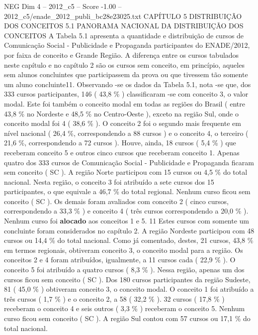\begin{textsample}{NEG Dim 4 – 2012\_c5 – Score -1.00 – 2012\_c5/enade\_2012\_publi\_bc28e23025.txt}  \label{ex:f4_neg_107}
CAPÍTULO 5 DISTRIBUIÇÃO DOS CONCEITOS 5.1 PANORAMA NACIONAL DA DISTRIBUIÇÃO DOS CONCEITOS A Tabela 5.1 apresenta a quantidade e distribuição de cursos de Comunicação Social - Publicidade e Propaganda participantes do ENADE/2012, por faixa de conceito e Grande Região.
A diferença entre os cursos tabulados neste capítulo e no capítulo 2 são os cursos sem conceito, em princípio, aqueles sem alunos concluintes que participassem da prova ou que tivessem tão somente um aluno concluinte11.
Observando -se os dados da Tabela 5.1, nota -se que, dos 333 cursos participantes, 146 ( 43,8 \% ) classificaram -se com conceito 3, o valor modal.
Este foi também o conceito modal em todas as regiões do Brasil ( entre 43,8 \% no Nordeste e 48,5 \% no Centro-Oeste ), exceto na região Sul, onde o conceito modal foi 4 ( 38,6 \% ).
O conceito 2 foi o segundo mais frequente em nível nacional ( 26,4 \%, correspondendo a 88 cursos ) e o conceito 4, o terceiro ( 21,6 \%, correspondendo a 72 cursos ).
Houve, ainda, 18 cursos ( 5,4 \% ) que receberam conceito 5 e outros cinco cursos que receberam conceito 1.
Apenas quatro dos 333 cursos de Comunicação Social - Publicidade e Propaganda ficaram sem conceito ( SC ).
A região Norte participou com 15 cursos ou 4,5 \% do total nacional.
Nesta região, o conceito 3 foi atribuído a sete cursos dos 15 participantes, o que equivale a 46,7 \% do total regional.
Nenhum curso ficou sem conceito ( SC ).
Os demais foram avaliados com conceito 2 ( cinco cursos, correspondendo a 33,3 \% ) e conceito 4 ( três cursos correspondendo a 20,0 \% ).
Nenhum curso foi \textbf{alocado} aos conceitos 1 e 5. 11 Estes cursos com somente um concluinte foram considerados no capítulo 2.
A região Nordeste participou com 48 cursos ou 14,4 \% do total nacional.
Como já comentado, destes, 21 cursos, 43,8 \% em termos regionais, obtiveram conceito 3, o conceito modal para a região.
Os conceitos 2 e 4 foram atribuídos, igualmente, a 11 cursos cada ( 22,9 \% ).
O conceito 5 foi atribuído a quatro cursos ( 8,3 \% ).
Nessa região, apenas um dos cursos ficou sem conceito ( SC ).
Dos 180 cursos participantes da região Sudeste, 81 ( 45,0 \% ) obtiveram conceito 3, o conceito modal.
O conceito 1 foi atribuído a três cursos ( 1,7 \% ) e o conceito 2, a 58 ( 32,2 \% ). 32 cursos ( 17,8 \% ) receberam o conceito 4 e seis outros ( 3,3 \% ) receberam o conceito 5.
Nenhum curso ficou sem conceito ( SC ).
A região Sul contou com 57 cursos ou 17,1 \% do total nacional.

\end{textsample}
